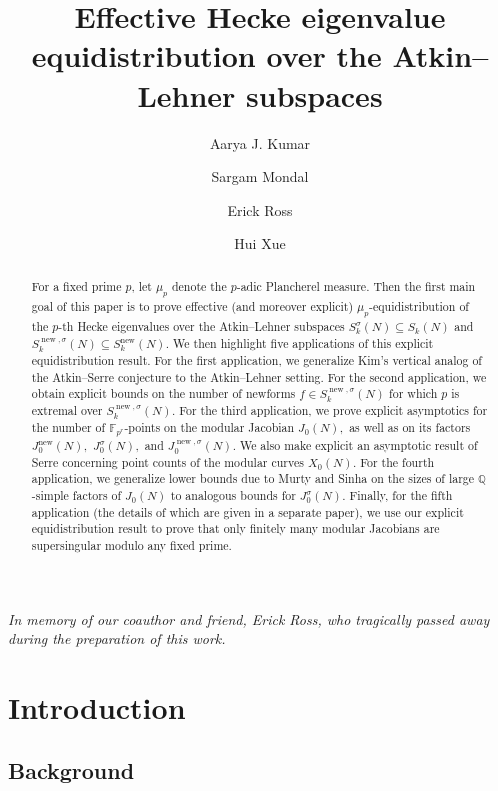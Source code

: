 \documentclass[11pt,letterpaper,reqno]{amsart}
\title{Effective Hecke eigenvalue equidistribution over the Atkin--Lehner subspaces}
\author[A. J. Kumar]{Aarya J. Kumar}
\author[S. Mondal]{Sargam Mondal}
\author[E. Ross]{Erick Ross}
\author[H. Xue]{Hui Xue}
\theoremstyle{definition}
\numberwithin{equation}{section}
\numberwithin{figure}{section}
\numberwithin{table}{section}
\let\subsectiontemp\subsection
\renewcommand{\subsection}[1]{ 
    \subsectiontemp{#1} \hfill\vspace{0.5\linespacing} 
}
\begin{document}
\begin{abstract}
    For a fixed prime $p$, let $\mu_p$ denote the $p$-adic Plancherel measure. Then the first main goal of this paper is to prove effective (and moreover explicit) $\mu_p$-equidistribution of the $p$-th Hecke eigenvalues over the Atkin--Lehner subspaces $S_k^\sigma(N) \subseteq S_k(N)$ and $S_k^{\operatorname{new}, \sigma}(N) \subseteq S_k^{\operatorname{new}}(N)$. We then highlight five applications of this explicit equidistribution result. For the first application, we generalize Kim's vertical analog of the Atkin--Serre conjecture to the Atkin--Lehner setting. For the second application, we obtain explicit bounds on the number of newforms $f \in S_k^{\operatorname{new}, \sigma}(N)$ for which $p$ is extremal over $S_k^{\operatorname{new}, \sigma}(N)$. For the third application, we prove explicit asymptotics for the number of $\mathbb{F}_{p^r}$-points on the modular Jacobian $J_0(N),$ as well as on its factors $J_0^{\operatorname{new}}(N),$ $J_0^\sigma(N),$ and $J_0^{\operatorname{new}, \sigma}(N)$. We also make explicit an asymptotic result of Serre concerning point counts of the modular curves $X_0(N)$. For the fourth application, we generalize lower bounds due to Murty and Sinha on the sizes of large $\mathbb{Q}$-simple factors of $J_0(N)$ to analogous bounds for $J_0^\sigma(N)$. Finally, for the fifth application (the details of which are given in a separate paper), we use our explicit equidistribution result to prove that only finitely many modular Jacobians are supersingular modulo any fixed prime.
\end{abstract}

\maketitle

\begin{center}
    \textit{In memory of our coauthor and friend, Erick Ross, who tragically passed away during the preparation of this work.}
\end{center}
\vspace{1ex}

\tableofcontents

\section{Introduction}\label{section:introduction}

\subsection{Background}
\end{document}
